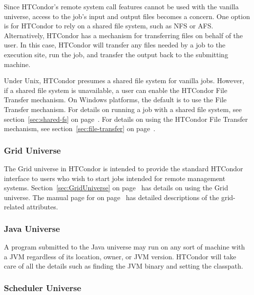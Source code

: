 Since HTCondor's remote system call features cannot be used with the
vanilla universe, access to the job's input and output files becomes a
concern.
One option is for HTCondor to rely on a shared file system, such as NFS
or AFS. 
Alternatively, HTCondor has a mechanism for transferring files on behalf
of the user.
In this case, HTCondor will transfer any files needed by a job to the
execution site, run the job, and transfer the output back to the
submitting machine.

Under Unix, HTCondor presumes a shared file system for vanilla jobs. 
However, if a shared file system is unavailable, a user can enable the
HTCondor File Transfer mechanism.
On Windows platforms, the default is to use the File Transfer
mechanism.
For details on running a job with a shared file system, see
section~\ref{sec:shared-fs} on page~\pageref{sec:shared-fs}.
For details on using the HTCondor File Transfer mechanism, see 
section~\ref{sec:file-transfer} on page~\pageref{sec:file-transfer}.


\subsubsection{Grid Universe}

The Grid universe in HTCondor is intended to provide the standard
HTCondor interface to users who wish to start jobs
intended for remote management systems.
Section~\ref{sec:GridUniverse} on page~\pageref{sec:GridUniverse}
has details on using the Grid universe.
The manual page for 
on page~\pageref{man-condor-submit}
has detailed descriptions of
the grid-related attributes.

\subsubsection{Java Universe}


A program submitted to the Java universe may run on any sort of machine
with a JVM regardless of its location, owner, or JVM version.  HTCondor
will take care of all the details such as finding the JVM binary and
setting the classpath.

\subsubsection{Scheduler Universe}

